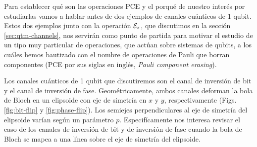 
Para establecer qué son las operaciones PCE y el porqué de nuestro interés por 
estudiarlas vamos a hablar antes de dos ejemplos 
de canales cuánticos de 1 qubit. Estos dos ejemplos junto con la operación
$\mathcal{E}_z$, que discutimos en la sección \ref{sec:qtm-channels}, nos servirán 
como punto de partida para motivar el estudio de un tipo muy particular 
de operaciones, que actúan sobre sistemas de qubits, a los cuáles hemos
bautizado con el nombre de operaciones de Pauli que borran 
componentes (PCE por sus siglas en inglés, \textit{Pauli component erasing}).

Los canales cuánticos de 1 qubit que discutiremos son el canal 
de inversión de bit y el canal de inversión de fase. 
Geométricamente, ambos canales deforman la bola 
de Bloch en un elipsoide con eje de simetría en $x$ y $y$,
respectivamente (Figs. \ref{fig:bit-flip} y \ref{fig:phase-flip}).
Los semiejes perpendiculares al eje de simetría del elipsoide
varían según un parámetro $p$. Especifícamente
nos interesa revisar el caso de los canales de inversión de bit 
y de inversión de fase cuando la bola de Bloch se mapea a una 
línea sobre el eje de simetría del elipsoide.

